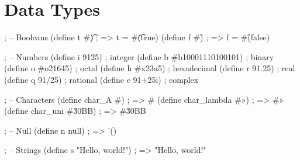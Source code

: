 
\section{Data Types}

\begin{racketcode}
; -- Booleans
(define t #\t) ; => t = #\t (true)
(define f #\f) ; => f = #\f (false)

; -- Numbers
(define i 9125)               ; integer
(define b #b10001110100101)    ; binary
(define o #o21645)              ; octal
(define h #x23a5)               ; hexadecimal
(define r 91.25)              ; real
(define q 91/25)              ; rational
(define c 91+25i)             ; complex

; -- Characters
(define char_A #\A)           ; => #\A
(define char_lambda #\Î»)      ; => #\Î»
(define char_uni #\u30BB)     ; => #\u30BB

; -- Null
(define n null) ; => '()

; -- Strings
(define s "Hello, world!") ; => "Hello, world!"
\end{racketcode}